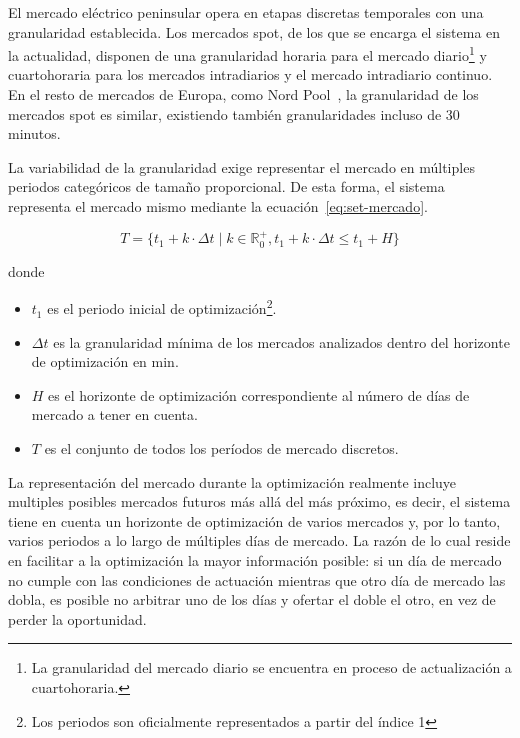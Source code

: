 El mercado eléctrico peninsular opera en etapas discretas temporales con una granularidad establecida. Los mercados spot, de los que se encarga el sistema en la actualidad, disponen de una granularidad horaria para el mercado diario\footnote{La granularidad del mercado diario se encuentra en proceso de actualización a cuartohoraria.} y cuartohoraria para los mercados intradiarios y el mercado intradiario continuo. En el resto de mercados de Europa, como Nord Pool~\cite{nord2025leading}, la granularidad de los mercados spot es similar, existiendo también granularidades incluso de 30 minutos.

La variabilidad de la granularidad exige representar el mercado en múltiples periodos categóricos de tamaño proporcional. De esta forma, el sistema representa el mercado mismo mediante la ecuación~\ref{eq:set-mercado}.

\begin{samepage}

  \begin{equation}%
    \label{eq:set-mercado}
    T = \{t_{1} + k \cdot \Delta t \mid k \in \mathbb{R}^{+}_{0}, t_{1} + k \cdot \Delta t \leq t_{1} + H\}
  \end{equation}

  donde

  \begin{itemize}

    \item \( t_{1} \) es el periodo inicial de optimización\footnote{Los periodos son oficialmente representados a partir del índice 1}.

    \item \( \Delta t \) es la granularidad mínima de los mercados analizados dentro del horizonte de optimización en \si{\minute}.

    \item \( H \) es el horizonte de optimización correspondiente al número de días de mercado a tener en cuenta.

    \item \( T \) es el conjunto de todos los períodos de mercado discretos.

  \end{itemize}

\end{samepage}

La representación del mercado durante la optimización realmente incluye multiples posibles mercados futuros más allá del más próximo, es decir, el sistema tiene en cuenta un horizonte de optimización de varios mercados y, por lo tanto, varios periodos a lo largo de múltiples días de mercado. La razón de lo cual reside en facilitar a la optimización la mayor información posible: si un día de mercado no cumple con las condiciones de actuación mientras que otro día de mercado las dobla, es posible no arbitrar uno de los días y ofertar el doble el otro, en vez de perder la oportunidad.

